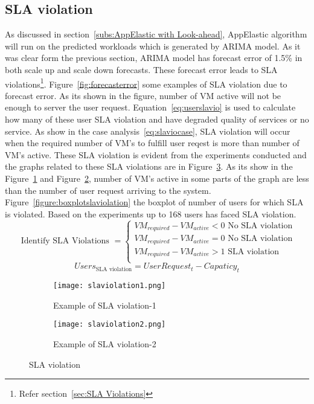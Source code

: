 \subsection{SLA violation}
\label{sub:SLA violation}
As discussed in section~\ref{subs:AppElastic with Look-ahead}, AppElastic algorithm will run on the predicted workloads which is generated by ARIMA model. As it was clear form the previous section, ARIMA model has forecast error of 1.5\% in both scale up and scale down forecasts. These forecast error leads to SLA violations\footnote{Refer section~\ref{sec:SLA Violations}}. Figure~\ref{fig:forecasterror} some examples of SLA violation due to forecast error. As its shown in the figure, number of VM active will not be enough to server the user request. Equation~\ref{eq:userslavio} is used to calculate how many of these user SLA violation and have degraded quality of services or no service. As show in the case analysis~\ref{eq:slaviocase}, SLA violation will occur when the required number of VM's to fulfill user reqest is more than number of VM's active. These SLA violation is evident from the experiments conducted and the graphs related to these SLA violations are in Figure~\ref{fig:slaviolationgraphs}. As its show in the Figure~\ref{figure:slaviolation1} and Figure~\ref{figure:slaviolation2}, number of VM's active in some parts of the graph are less than the number of user request arriving to the system. Figure~\ref{figure:boxplotslaviolation} the boxplot of number of users for which SLA is violated. Based on the experiments up to 168 users has faced SLA violation.
\begin{equation}
\textrm{ Identify SLA Violations }=
  \begin{cases}
    VM_{required} - VM_{active} < 0 \textrm{ No SLA violation}\\
    VM_{required} - VM_{active} = 0 \textrm{ No SLA violation}\\
    VM_{required} - VM_{active} > 1 \textrm{ SLA violation}\\
\end{cases}
\label{eq:slaviocase}
\end{equation}
\begin{equation}
Users_{\textrm{SLA violation}} = UserRequest_{t} - Capaticy_{t}
\label{eq:userslavio}
\end{equation}
\begin{figure}
     \centering
     \begin{subfigure}[b]{0.45\textwidth}
         \texttt{[image: slaviolation1.png]}
         \caption{Example of SLA violation-1}
         \label{figure:slaviolation1}
     \end{subfigure}
     \hfill
     \begin{subfigure}[b]{0.45\textwidth}
         \texttt{[image: slaviolation2.png]}
         \caption{Example of SLA violation-2}
         \label{figure:slaviolation2}
     \end{subfigure}
     \caption{SLA violation}
     \label{fig:slaviolationgraphs}
\end{figure}

